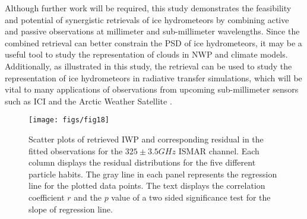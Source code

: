 \documentclass[journal abbreviation, manuscript]{copernicus}
\begin{document}
Although further work will be required, this study demonstrates the feasibility
and potential of synergistic retrievals of ice hydrometeors by combining active
and passive observations at millimeter and sub-millimeter wavelengths. Since the
combined retrieval can better constrain the PSD of ice hydrometeors, it may be a
useful tool to study the representation of clouds in NWP and climate models.
Additionally, as illustrated in this study, the retrieval can be used to study
the representation of ice hydrometeors in radiative transfer simulations, which
will be vital to many applications of observations from upcoming sub-millimeter
sensors such as ICI and the Arctic Weather Satellite
\citep{arctic_weather_satellite}.







\appendix







\appendixfigures
\begin{figure}
  \centering
  \texttt{[image: figs/fig18]}
  \caption{
    Scatter plots of retrieved IWP and corresponding residual in the fitted
    observations for the $325 \pm 3.5 \unit{GHz}$ ISMAR channel. Each column displays
    the residual distributions for the five different particle habits. The gray
    line in each panel represents the regression line for the plotted data
    points. The text displays the correlation coefficient $r$ and the $p$ value
    of a two sided significance test for the slope of regression line.
  }
  \label{fig:residuals_scatter}
\end{figure}
\end{document}

